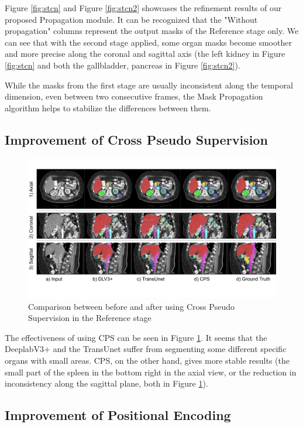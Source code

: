 Figure \ref{fig:stcn} and Figure \ref{fig:stcn2} showcases the refinement results of our proposed Propagation module. It can be recognized that the "Without propagation" columns represent the output masks of the Reference stage only.  We can see that with the second stage applied, some organ masks become smoother and more precise along the coronal and sagittal axis (the left kidney in Figure \ref{fig:stcn} and both the gallbladder, pancreas in Figure \ref{fig:stcn2}).

While the masks from the first stage are usually inconsistent along the temporal dimension, even between two consecutive frames, the Mask Propagation algorithm helps to stabilize the differences between them.

\subsection{Improvement of Cross Pseudo Supervision}

\begin{figure}[!h]
\centering
\includegraphics[width=\textwidth]{content/resources/new_images/qualitative/cps.pdf}
\caption{Comparison between before and after using Cross Pseudo Supervision in the Reference stage}
\label{fig:cps_improvement}
\end{figure}

The effectiveness of using CPS can be seen in Figure \ref{fig:cps_improvement}. It seems that the DeeplabV3+ and the TransUnet suffer from segmenting some different specific organs with small areas. CPS, on the other hand, gives more stable results (the small part of the spleen in the bottom right in the axial view, or the reduction in inconsistency along the sagittal plane, both in Figure \ref{fig:cps_improvement}).

\subsection{Improvement of Positional Encoding}


